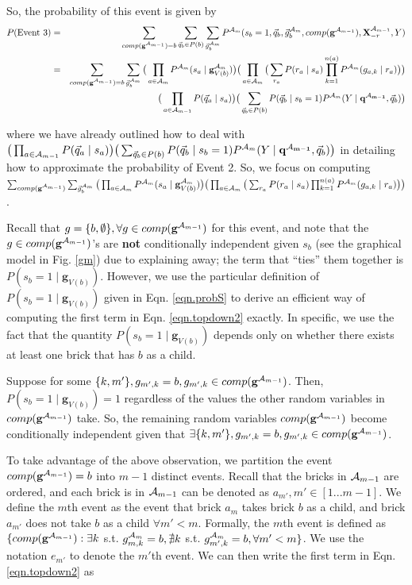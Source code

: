 \documentclass[11pt]{article}
\newcommand{\A}{{\cal A}}
\newcommand{\X}{\mathbf{X}}
\newcommand{\XrmPrev}{\X^{\A_{m-1}}_{-r}}
\newcommand{\Am}{\A_{m}}
\newcommand{\gcompPrev}{comp(\mathbf{g}^{\A_{m-1}})}
\newcommand{\qb}{\vec{q}_b}
\newcommand{\qa}{\vec{q}_a}
\begin{document}
So, the probability of this event is given by
\begin{eqnarray}
P(\text{Event 3}) &=& \sum_{\gcompPrev = b} \sum_{\vec{q}_b \in P(b)} \sum_{\vec{g}^{\Am}_{b}} P^{\Am}(s_b=1, \vec{q}_b, \vec{g}^{\Am}_{b}, \gcompPrev, \XrmPrev, Y) \\
%
&=& \sum_{\gcompPrev = b} \sum_{\vec{g}^{\Am}_{b}} \big( \prod_{a \in {\Am}} P^{\Am}(s_a \mid \mathbf{g}^{\Am}_{V({b})}) \big ) \big( \prod_{a \in {\A_{m}}} \big( \sum_{r_a} P(r_a \mid s_a) \prod_{k=1}^{n(a)} P^{\Am}(g_{a,k} \mid r_a) \big) \big) \label{eqn.topdown2} \\
%
& & \big( \prod_{a \in {\A_{m-1}}} P(\qa \mid s_a)\big) \big( \sum_{\vec{q}_b \in P(b)} P(\qb \mid s_b = 1) P^{\Am}(Y \mid \mathbf{q^{\A_{m-1}}}, \vec{q}_b) \big) \nonumber
\end{eqnarray}

where we have already outlined how to deal with $\big( \prod_{a \in {\A_{m-1}}} P(\qa \mid s_a)\big) \big( \sum_{\vec{q}_b \in P(b)} P(\qb \mid s_b = 1) P^{\Am}(Y \mid \mathbf{q^{\A_{m-1}}}, \vec{q}_b) \big)$ in detailing how to approximate the probability of Event 2. So, we focus on computing $\sum_{\gcompPrev}  \sum_{\vec{g}^{\Am}_{b}} \big( \prod_{a \in {\Am}} P^{\Am}(s_a \mid \mathbf{g}^{\Am}_{V({b})}) \big ) \big( \prod_{a \in {\A_{m}}} \big( \sum_{r_a} P(r_a \mid s_a) \prod_{k=1}^{n(a)} P^{\Am}(g_{a,k} \mid r_a) \big) \big)$.

Recall that $g = \{b, \emptyset\}, \forall g \in \gcompPrev$ for this event, and note that the $g \in \gcompPrev$'s are \textbf{not} conditionally independent given $s_b$ (see the graphical model in Fig. \ref{gm}) due to explaining away; the term that ``ties'' them together is  $P(s_b = 1 \mid \mathbf{g}_{V(b)})$. However, we use the particular definition of  $P(s_b = 1 \mid \mathbf{g}_{V(b)})$  given in Eqn. \ref{eqn.probS} to derive an efficient way of computing the first term in Eqn. \ref{eqn.topdown2} exactly. In specific, we use the fact that  the quantity $P(s_b = 1 \mid \mathbf{g}_{V(b)})$  depends only on whether there exists at least one brick that has $b$ as a child.

Suppose for some $\{k,m'\}, g_{m',k} = b, g_{m',k} \in \gcompPrev$. Then, $P(s_b = 1 \mid \mathbf{g}_{V(b)}) = 1$ regardless of the values the other random variables in $\gcompPrev$ take. So, the remaining random variables $\gcompPrev$ become conditionally independent given that $\exists \{k,m'\}, g_{m',k} = b, g_{m',k} \in \gcompPrev$.

To take advantage of the above observation, we partition the event $\gcompPrev = b$ into $m-1$ distinct events. Recall that the bricks in
$\A_{m-1}$ are ordered, and each brick is in $\A_{m-1}$  can be denoted as $a_{m'}, m' \in [1...m-1]$. We define the $m$th event as the event that brick $a_{m}$ takes brick $b$ as a child, and brick $a_{m'}$ does not take $b$ as a child $\forall m' < m$. Formally, the $m$th event is defined as $\{\gcompPrev : \exists k$ s.t. $g^{\Am}_{m,k} = b, \nexists k$ s.t. $g^{\Am}_{m',k} = b, \forall m' < m \}$. We use the notation $e_{m'}$ to denote the $m'$th event.  We can then write the first term in Eqn. \ref{eqn.topdown2} as
\end{document}
